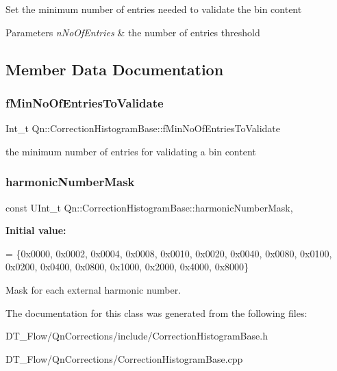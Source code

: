 Set the minimum number of entries needed to validate the bin content 
\begin{DoxyParams}{Parameters}
{\em n\+No\+Of\+Entries} & the number of entries threshold \\
\hline
\end{DoxyParams}


\subsection{Member Data Documentation}
\mbox{\label{classQn_1_1CorrectionHistogramBase_a3a377eb100c6b5dc6c1c0c1f35f071b7}} 
\subsubsection{\texorpdfstring{f\+Min\+No\+Of\+Entries\+To\+Validate}{fMinNoOfEntriesToValidate}}
{\footnotesize\ttfamily Int\+\_\+t Qn\+::\+Correction\+Histogram\+Base\+::f\+Min\+No\+Of\+Entries\+To\+Validate\hspace{0.3cm}{\ttfamily [protected]}}

the minimum number of entries for validating a bin content \mbox{\label{classQn_1_1CorrectionHistogramBase_a5a719ffc64b87fe2b04190a69ac75919}} 
\subsubsection{\texorpdfstring{harmonic\+Number\+Mask}{harmonicNumberMask}}
{\footnotesize\ttfamily const U\+Int\+\_\+t Qn\+::\+Correction\+Histogram\+Base\+::harmonic\+Number\+Mask\hspace{0.3cm}{\ttfamily [static]}, {\ttfamily [protected]}}

{\bfseries Initial value\+:}
\begin{DoxyCode}
=
    \{0x0000, 0x0002, 0x0004, 0x0008, 0x0010, 0x0020, 0x0040, 0x0080,
     0x0100, 0x0200, 0x0400, 0x0800, 0x1000, 0x2000, 0x4000, 0x8000\}
\end{DoxyCode}


Mask for each external harmonic number. 



The documentation for this class was generated from the following files\+:\begin{DoxyCompactItemize}
\item 
D\+T\+\_\+\+Flow/\+Qn\+Corrections/include/Correction\+Histogram\+Base.\+h\item 
D\+T\+\_\+\+Flow/\+Qn\+Corrections/Correction\+Histogram\+Base.\+cpp\end{DoxyCompactItemize}
